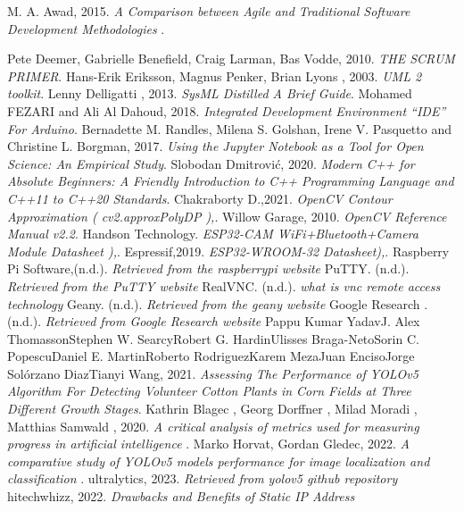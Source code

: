 \begin{thebibliography}{20}
M. A. Awad, 2015. \emph{A Comparison between Agile and Traditional Software Development Methodologies 
}.

Pete Deemer, Gabrielle Benefield, Craig Larman, Bas Vodde, 2010. \emph{THE
SCRUM PRIMER}.
Hans-Erik Eriksson, Magnus Penker, Brian Lyons
, 2003. \emph{UML 2 toolkit}.
Lenny Delligatti , 2013. \emph{SysML Distilled A Brief Guide}.
 Mohamed FEZARI and Ali Al Dahoud, 2018. \emph{Integrated Development Environment “IDE” For Arduino}.
Bernadette M. Randles, Milena S. Golshan, Irene V. Pasquetto and Christine L. Borgman, 2017. \emph{Using the Jupyter Notebook as a Tool for Open Science: An Empirical Study}.
Slobodan Dmitrović, 2020. \emph{ Modern C++ for Absolute Beginners: A Friendly Introduction to C++ Programming Language and C++11 to C++20 Standards}.
Chakraborty D.,2021. \emph{ OpenCV Contour Approximation ( cv2.approxPolyDP ),}.
Willow Garage, 2010. \emph{OpenCV Reference Manual v2.2}.
Handson Technology. \emph{ ESP32-CAM WiFi+Bluetooth+Camera Module Datasheet ),}.
Espressif,2019. \emph{ ESP32-WROOM-32 Datasheet),}.
Raspberry Pi Software,(n.d.). \emph{Retrieved from the raspberrypi website}%
PuTTY. (n.d.). \emph{Retrieved from the PuTTY website} %
RealVNC. (n.d.). \emph{what is vnc remote access technology}%
Geany. (n.d.). \emph{Retrieved from the geany website} %
Google Research . (n.d.). \emph{ Retrieved from Google Research website} %
Pappu Kumar YadavJ. Alex ThomassonStephen W. SearcyRobert G. HardinUlisses Braga-NetoSorin C. PopescuDaniel E. MartinRoberto RodriguezKarem MezaJuan EncisoJorge Solórzano DiazTianyi Wang, 2021. \emph{ Assessing The Performance of YOLOv5 Algorithm For Detecting Volunteer Cotton Plants in Corn Fields at Three Different Growth Stages}.
Kathrin Blagec  , Georg Dorffner  , Milad Moradi , Matthias Samwald , 2020. \emph{ A critical analysis of metrics used for measuring progress in artificial intelligence }.
Marko Horvat, Gordan Gledec, 2022. \emph{A comparative study of YOLOv5 models performance for image localization and classification  }.
ultralytics, 2023. \emph{Retrieved from yolov5 github repository} %
hitechwhizz, 2022. \emph{ Drawbacks and Benefits of Static IP Address}



\end{thebibliography}
